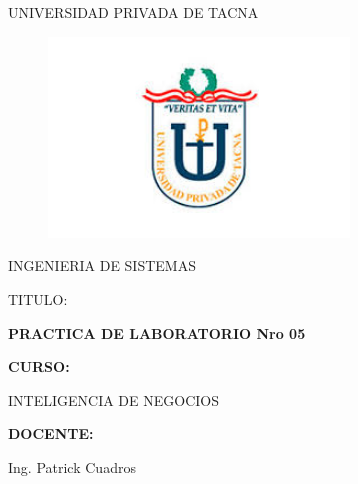 \documentclass[12pt,letterpaper]{article}
\begin{document}
\begin{titlepage}
\begin{center}
\large{UNIVERSIDAD PRIVADA DE TACNA}\\
\vspace*{-0.025in}
\begin{figure}[htb]
\begin{center}
\includegraphics[width=8cm]{./IMG/logo}
\end{center}
\end{figure}
\vspace*{0.15in}
INGENIERIA DE SISTEMAS  \\

\vspace*{0.5in}
\begin{large}
TITULO:\\
\end{large}

\vspace*{0.1in}
\begin{Large}
\textbf{PRACTICA DE LABORATORIO Nro 05} \\
\end{Large}

\vspace*{0.3in}
\begin{Large}
\textbf{CURSO:} \\
\end{Large}

\vspace*{0.1in}
\begin{large}
INTELIGENCIA DE NEGOCIOS\\
\end{large}

\vspace*{0.3in}
\begin{Large}
\textbf{DOCENTE:} \\
\end{Large}

\vspace*{0.1in}
\begin{large}
 Ing. Patrick Cuadros\\
\end{large}


\end{center}
\end{titlepage}
\end{document}
